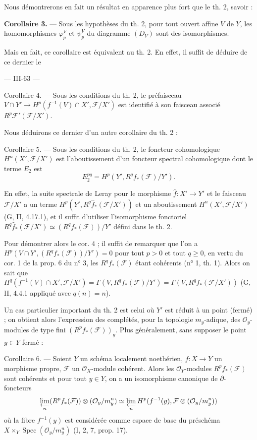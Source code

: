 \noindent Nous démontrerons en fait un résultat en apparence plus fort que le th. 2, savoir :

\noindent \textbf{Corollaire 3.} --- Sous les hypothèses du th. 2, pour tout ouvert affine $V$ de $Y$, les homomorphismes $\varphi_p^V$ et $\psi_p^V$ du diagramme $(D_V)$ sont des isomorphismes.

\noindent Mais en fait, ce corollaire est équivalent au th. 2. En effet, il suffit de déduire de ce dernier le

\newpage



--- III-63 ---

Corollaire 4. --- Sous les conditions du th. 2, le préfaisceau $V \cap Y' \to H^p(f^{-1}(V) \cap X', \mathcal{F}/X')$ est identifié à son faisceau associé $R^p\mathcal{F}'(\mathcal{F}/X')$.

Nous déduirons ce dernier d'un autre corollaire du th. 2 :

Corollaire 5. --- Sous les conditions du th. 2, le foncteur cohomologique $H^n(X', \mathcal{F}/X')$ est l'aboutissement d'un foncteur spectral cohomologique dont le terme $E_2$ est
$$E_2^{pq} = H^p(Y', R^qf_*(\mathcal{F})/Y').$$

En effet, la suite spectrale de Leray pour le morphisme $\hat{f} : X' \to Y'$ et le faisceau $\mathcal{F}/X'$ a un terme $H^p(Y', R^q\hat{f}_*(\mathcal{F}/X'))$ et un aboutissement $H^n(X', \mathcal{F}/X')$ (G, II, 4.17.1), et il suffit d'utiliser l'isomorphisme fonctoriel $R^q\hat{f}_*(\mathcal{F}/X') \simeq (R^qf_*(\mathcal{F}))/Y'$ défini dans le th. 2.

Pour démontrer alors le cor. 4 ; il suffit de remarquer que l'on a $H^p(V \cap Y', (R^qf_*(\mathcal{F}))/Y') = 0$ pour tout $p > 0$ et tout $q \ge 0$, en vertu du cor. 1 de la prop. 6 du n° 3, les $R^qf_*(\mathcal{F})$ étant cohérents (n° 1, th. 1). Alors on sait que $H^q(f^{-1}(V) \cap X', \mathcal{F}/X') = \Gamma(V, R^qf_*(\mathcal{F})/Y') = \Gamma(V, R^qf_*(\mathcal{F}/X'))$ (G, II, 4.4.1 appliqué avec $q(n)=n$).

Un cas particulier important du th. 2 est celui où $Y'$ est réduit à un point (fermé) ; on obtient alors l'expression des complétés, pour la topologie $m_y$-adique, des $\mathcal{O}_y$-modules de type fini $(R^pf_*(\mathcal{F}))_y$. Plus généralement, sans supposer le point $y \in Y$ fermé :

Corollaire 6. --- Soient $Y$ un schéma localement noethérien, $f : X \to Y$ un morphisme propre, $\mathcal{F}$ un $\mathcal{O}_X$-module cohérent. Alors les $\mathcal{O}_Y$-modules $R^pf_*(\mathcal{F})$ sont cohérents et pour tout $y \in Y$, on a un isomorphisme canonique de $\partial$-foncteurs
$$\varprojlim_n (R^pf_*(\mathcal{F})) \otimes (\mathcal{O}_y/m_y^n) \simeq \varprojlim_n H^p(f^{-1}(y), \mathcal{F} \otimes (\mathcal{O}_y/m_y^n))$$
où la fibre $f^{-1}(y)$ est considérée comme espace de base du préschéma $X \times_Y \operatorname{Spec}(\mathcal{O}_y/m_y^n)$ (I, 2, 7, prop. 17).

